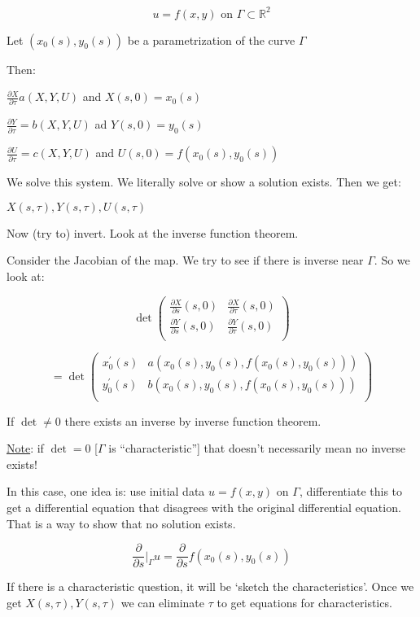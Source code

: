 \documentclass{article}
\theoremstyle{definition}
\begin{document}
\[
    u = f(x,y) \text{ on } \Gamma \subset \mathbb{R}^2
\]

Let \((x_0(s),y_0(s))\) be a parametrization of the curve \(\Gamma\) 

Then:

\(\frac{\partial X}{\partial \tau} a(X,Y,U)\) and \(X(s,0)=x_0(s)\) 

\(\frac{\partial Y}{\partial \tau } = b(X,Y,U)\) ad \(Y(s,0)=y_0(s)\) 

\(\frac{\partial U}{\partial \tau} = c(X,Y,U)\) and \(U(s,0)=f(x_0(s),y_0(s))\) 

We solve this system. We literally solve or show a solution exists. Then we get:

\(X(s,\tau),Y(s,\tau),U(s,\tau)\)

Now (try to) invert. Look at the inverse function theorem.

Consider the Jacobian of the map. We try to see if there is inverse near \(\Gamma\).  So we look at:

\[
    \det \begin{pmatrix}
        \frac{\partial X}{\partial s} (s,0) & \frac{\partial X}{\partial \tau}(s,0)   \\
        \frac{\partial Y}{\partial s} (s,0) & \frac{\partial Y}{\partial \tau}(s,0) \\
    \end{pmatrix}
\]

\[
    = \det \begin{pmatrix}
        x_0^{\prime}(s) &  a(x_0(s),y_0(s), f(x_0(s),y_0(s))) \\
        y_0^{\prime}(s) & b(x_0(s),y_0(s),f(x_0(s),y_0(s)))  \\
    \end{pmatrix}
\]

If \(\det \neq 0\) there exists an inverse by inverse function theorem.

\underline{Note}: if \(\det = 0\) [\(\Gamma\) is ``characteristic''] that doesn't necessarily mean no inverse exists!

In this case, one idea is: use initial data \(u=f(x,y)\) on \(\Gamma\), differentiate this to get a differential equation that disagrees with the original differential equation. That is a way to show that no solution exists.

\[\frac{\partial}{\partial s}|_\Gamma u = \frac{\partial}{\partial s} f(x_0(s),y_0(s))\] 

If there is a characteristic question, it will be `sketch the characteristics'. Once we get \(X(s,\tau), Y(s,\tau)\) we can eliminate \(\tau\) to get equations for characteristics.
\end{document}
